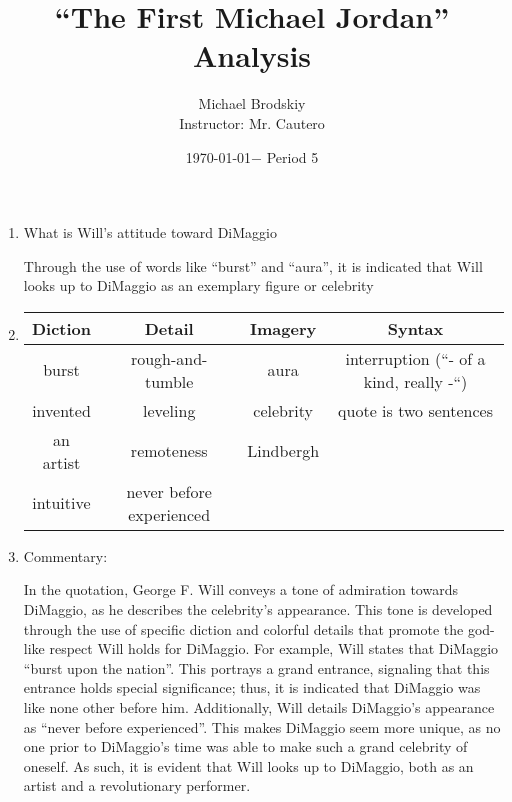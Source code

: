 \documentclass[12pt]{article}
\title{“The First Michael Jordan” Analysis}
\date{\today $-$ Period 5}
\author{Michael Brodskiy\\ \small Instructor: Mr. Cautero}
\begin{document}
\maketitle

\begin{enumerate}

  \item What is Will's attitude toward DiMaggio

    Through the use of words like “burst” and “aura”, it is indicated that Will looks up to DiMaggio as an exemplary figure or celebrity

  \item \begin{tabular}{|c|c|c|c|} \hline \textbf{Diction} & \textbf{Detail} & \textbf{Imagery} & \textbf{Syntax} \\ \hline burst & rough-and-tumble & aura & interruption (“- of a kind, really -“)\\ \hline invented & leveling & celebrity & quote is two sentences \\ \hline an artist & remoteness & Lindbergh & \\ \hline intuitive & never before experienced & & \\ \hline \end{tabular}

  \item Commentary:

    In the quotation, George F. Will conveys a tone of admiration towards DiMaggio, as he describes the celebrity's appearance. This tone is developed through the use of specific diction and colorful details that promote the god-like respect Will holds for DiMaggio. For example, Will states that DiMaggio “burst upon the nation”. This portrays a grand entrance, signaling that this entrance holds special significance; thus, it is indicated that DiMaggio was like none other before him. Additionally, Will details DiMaggio's appearance as “never before experienced”. This makes DiMaggio seem more unique, as no one prior to DiMaggio's time was able to make such a grand celebrity of oneself. As such, it is evident that Will looks up to DiMaggio, both as an artist and a revolutionary performer.

\end{enumerate}
\end{document}
